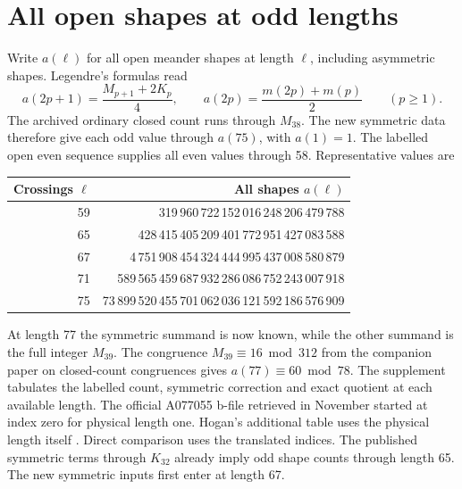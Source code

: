 \section{All open shapes at odd lengths}
Write \(a(\ell)\) for all open meander shapes at length \(\ell\), including asymmetric shapes. Legendre's formulas read
\[
 a(2p+1)=\frac{M_{p+1}+2K_p}{4},\qquad
 a(2p)=\frac{m(2p)+m(p)}{2}\qquad(p\ge1).
\]
The archived ordinary closed count runs through \(M_{38}\). The new symmetric data therefore give each odd value through \(a(75)\), with \(a(1)=1\). The labelled open even sequence supplies all even values through 58. Representative values are
\begin{center}
\begin{tabular}{rr}\toprule
Crossings \(\ell\)&All shapes \(a(\ell)\)\\\midrule
59 & 319\,960\,722\,152\,016\,248\,206\,479\,788\\
65 & 428\,415\,405\,209\,401\,772\,951\,427\,083\,588\\
67 & 4\,751\,908\,454\,324\,444\,995\,437\,008\,580\,879\\
71 & 589\,565\,459\,687\,932\,286\,086\,752\,243\,007\,918\\
75 & 73\,899\,520\,455\,701\,062\,036\,121\,592\,186\,576\,909\\
\bottomrule\end{tabular}
\end{center}
At length 77 the symmetric summand is now known, while the other summand is the full integer \(M_{39}\). The congruence \(M_{39}\equiv16\bmod312\) from the companion paper on closed-count congruences gives \(a(77)\equiv60\bmod78\). The supplement tabulates the labelled count, symmetric correction and exact quotient at each available length. The official A077055 b-file retrieved in November started at index zero for physical length one. Hogan's additional table uses the physical length itself \cite{shapes,hogan}. Direct comparison uses the translated indices. The published symmetric terms through \(K_{32}\) already imply odd shape counts through length 65. The new symmetric inputs first enter at length 67.

